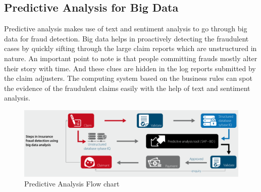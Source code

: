 \documentclass[sigconf]{acmart}
\begin{document}
\subsection{Predictive Analysis for Big Data}
Predictive analysis makes use of text and sentiment analysis to go through big data for fraud detection. Big data helps in proactively detecting the fraudulent cases by quickly sifting through the large claim reports which are unstructured in nature. An important point to note is that people committing frauds mostly alter their story with time. And these clues are hidden in the log reports submitted by the claim adjusters. The computing system based on the business rules can spot the evidence of the fraudulent claims easily with the help of text and sentiment analysis. \cite{link7}
\begin{figure}
  \includegraphics[width=\linewidth]{images/predictive_image1.png}
  \caption{Predictive Analysis Flow chart}
  \label{fig:Predictive Analysis flowchart}
\end{figure}
\end{document}
